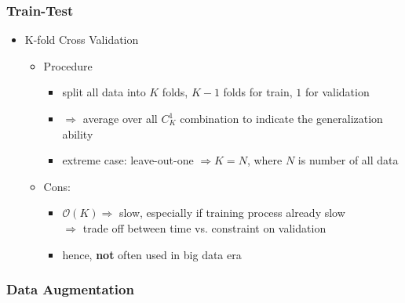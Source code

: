 \subsubsection{Train-Test}
\begin{itemize}
\item K-fold Cross Validation
	\begin{itemize}
	\item Procedure
		\begin{itemize}
		\item split all data into $K$ folds, $K-1$ folds for train, $1$ for validation
		
		\item $\Rightarrow$ average over all $C^1_K$ combination to indicate the generalization ability
	
		\item extreme case: leave-out-one $\Rightarrow K=N$, where $N$ is number of all data
		\end{itemize}
	
	\item Cons:
		\begin{itemize}
		\item $\mathcal O(K) \Rightarrow$ slow, especially if training process already slow \\
		$\Rightarrow$ trade off between time vs. constraint on validation
		\item hence, \textbf{not} often used in big data era
		\end{itemize}
	\end{itemize}
\end{itemize}

\subsubsection{Data Augmentation}

